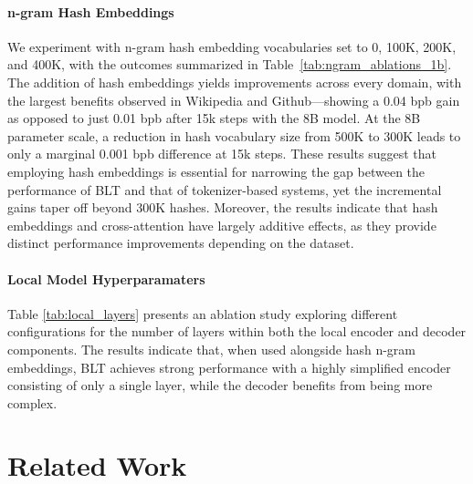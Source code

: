 \paragraph{n-gram Hash Embeddings} 

We experiment with n-gram hash embedding vocabularies set to 0, 100K, 200K, and 400K, with the outcomes summarized in Table~\ref{tab:ngram_ablations_1b}. The addition of hash embeddings yields improvements across every domain, with the largest benefits observed in Wikipedia and Github—showing a 0.04 bpb gain as opposed to just 0.01 bpb after 15k steps with the 8B model. At the 8B parameter scale, a reduction in hash vocabulary size from 500K to 300K leads to only a marginal 0.001 bpb difference at 15k steps. These results suggest that employing hash embeddings is essential for narrowing the gap between the performance of {\textsc BLT} and that of tokenizer-based systems, yet the incremental gains taper off beyond 300K hashes. Moreover, the results indicate that hash embeddings and cross-attention have largely additive effects, as they provide distinct performance improvements depending on the dataset.

\paragraph{Local Model Hyperparamaters} Table \ref{tab:local_layers} presents an ablation study exploring different configurations for the number of layers within both the local encoder and decoder components. The results indicate that, when used alongside hash n-gram embeddings, {\textsc BLT} achieves strong performance with a highly simplified encoder consisting of only a single layer, while the decoder benefits from being more complex.

\section{Related Work}
\label{section:related_work}

